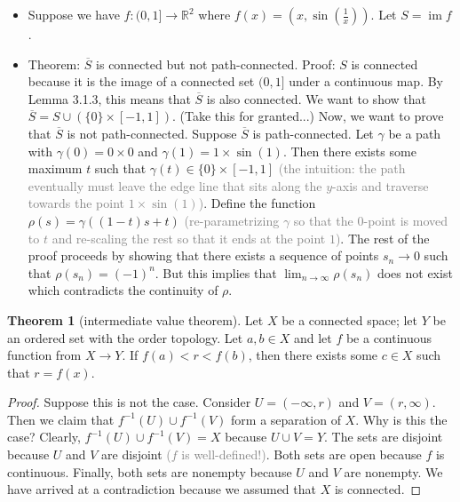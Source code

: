 \documentclass{article}
\newcommand{\com}[1]{\textcolor{grey}{#1}}
\theoremstyle{definition}
\newtheorem{theorem}{Theorem}[subsection]
\begin{document}
\begin{flushleft}
\begin{itemize}
    \item Suppose we have $f: (0, 1] \to \mathbb{R}^2$ where $f(x) = (x, \sin\left(\frac{1}{x}\right))$. Let $S = \; \text{im} \; f$.
    \item Theorem: $\overline{S}$ is connected but not path-connected. Proof: $S$ is connected because it is the image of a connected set $(0,1]$ under a continuous map. By Lemma 3.1.3, this means that $\overline{S}$ is also connected. We want to show that $\overline{S} = S \cup (\{0\} \times [-1,1])$. (Take this for granted...) Now, we want to prove that $\overline{S}$ is not path-connected. Suppose $\overline{S}$ is path-connected. Let $\gamma$ be a path with $\gamma(0) = 0 \times 0$ and $\gamma(1) = 1 \times \sin(1)$. Then there exists some maximum $t$ such that $\gamma(t) \in \{0\} \times [-1,1]$ \com{(the intuition: the path eventually must leave the edge line that sits along the $y$-axis and traverse towards the point $1 \times \sin(1)$)}. Define the function $\rho(s) = \gamma((1-t)s+t)$ \com{(re-parametrizing $\gamma$ so that the $0$-point is moved to $t$ and re-scaling the rest so that it ends at the point $1$)}. The rest of the proof proceeds by showing that there exists a sequence of points $s_n \to 0$ such that $\rho(s_n) = (-1)^n$. But this implies that $\lim_{n \to \infty} \rho(s_n)$ does not exist which contradicts the continuity of $\rho$.
\end{itemize}

\begin{theorem}[intermediate value theorem]
Let $X$ be a connected space; let $Y$ be an ordered set with the order topology. Let $a,b \in X$ and let $f$ be a continuous function from $X \to Y$. If $f(a) < r < f(b)$, then there exists some $c \in X$ such that $r = f(x)$.
\end{theorem}

\begin{proof}
Suppose this is not the case. Consider $U = (-\infty, r)$ and $V = (r, \infty)$. Then we claim that $f^{-1}(U) \cup f^{-1}(V)$ form a separation of $X$. Why is this the case? Clearly, $f^{-1}(U) \cup f^{-1}(V) = X$ because $U \cup V = Y$. The sets are disjoint because $U$ and $V$ are disjoint \com{($f$ is well-defined!)}. Both sets are open because $f$ is continuous. Finally, both sets are nonempty because $U$ and $V$ are nonempty. We have arrived at a contradiction because we assumed that $X$ is connected.
\end{proof}


\end{flushleft}
\end{document}
